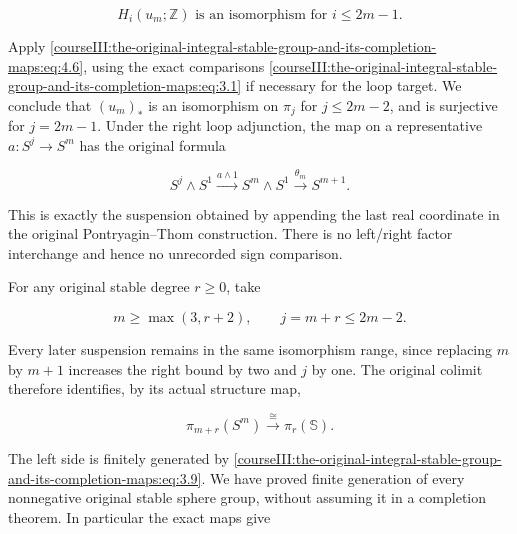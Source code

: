 \begin{equation}
H_i(u_m;\mathbb Z)\text{ is an isomorphism for }i\leq2m-1.
 \label{courseIII:the-original-integral-stable-group-and-its-completion-maps:eq:5.6}
\end{equation}

Apply \eqref{courseIII:the-original-integral-stable-group-and-its-completion-maps:eq:4.6}, using the exact comparisons \eqref{courseIII:the-original-integral-stable-group-and-its-completion-maps:eq:3.1} if necessary for the loop target. We conclude that \((u_m)_*\) is an isomorphism on \(\pi_j\) for \(j\leq2m-2\), and is surjective for \(j=2m-1\). Under the right loop adjunction, the map on a representative \(a:S^j\to S^m\) has the original formula

\begin{equation}
S^j\wedge S^1\xrightarrow{a\wedge1}S^m\wedge S^1
   \xrightarrow{\theta_m}S^{m+1}.
 \label{courseIII:the-original-integral-stable-group-and-its-completion-maps:eq:5.7}
\end{equation}

This is exactly the suspension obtained by appending the last real coordinate in the original Pontryagin--Thom construction. There is no left/right factor interchange and hence no unrecorded sign comparison.

For any original stable degree \(r\geq0\), take

\begin{equation}
m\geq\max(3,r+2),\qquad j=m+r\leq2m-2.
 \label{courseIII:the-original-integral-stable-group-and-its-completion-maps:eq:5.8}
\end{equation}

Every later suspension remains in the same isomorphism range, since replacing \(m\) by \(m+1\) increases the right bound by two and \(j\) by one. The original colimit therefore identifies, by its actual structure map,

\begin{equation}
\pi_{m+r}(S^m)\xrightarrow{\cong}\pi_r(\mathbb S).
 \label{courseIII:the-original-integral-stable-group-and-its-completion-maps:eq:5.9}
\end{equation}

The left side is finitely generated by \eqref{courseIII:the-original-integral-stable-group-and-its-completion-maps:eq:3.9}. We have proved finite generation of every nonnegative original stable sphere group, without assuming it in a completion theorem. In particular the exact maps give

